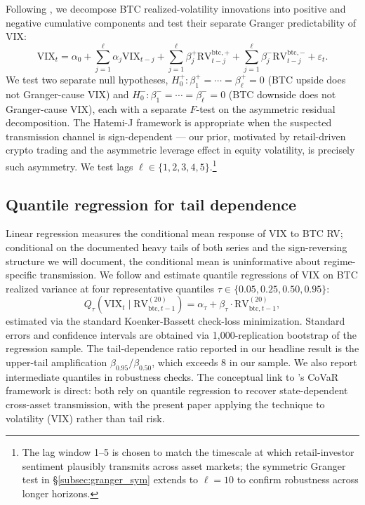 \documentclass[11pt,a4paper]{article}
\begin{document}
Following \citet{hatemi2012}, we decompose BTC realized-volatility innovations into positive and negative cumulative components and test their separate Granger predictability of VIX:
\begin{equation}
\text{VIX}_t = \alpha_0 + \sum_{j=1}^{\ell} \alpha_j \text{VIX}_{t-j} + \sum_{j=1}^{\ell} \beta^{+}_j \text{RV}^{\text{btc},+}_{t-j} + \sum_{j=1}^{\ell} \beta^{-}_j \text{RV}^{\text{btc},-}_{t-j} + \varepsilon_t.
\label{eq:granger_asym}
\end{equation}
We test two separate null hypotheses, $H_0^+: \beta^{+}_1 = \cdots = \beta^{+}_\ell = 0$ (BTC upside does not Granger-cause VIX) and $H_0^-: \beta^{-}_1 = \cdots = \beta^{-}_\ell = 0$ (BTC downside does not Granger-cause VIX), each with a separate $F$-test on the asymmetric residual decomposition. The Hatemi-J framework is appropriate when the suspected transmission channel is sign-dependent --- our prior, motivated by retail-driven crypto trading and the asymmetric leverage effect in equity volatility, is precisely such asymmetry. We test lags $\ell \in \{1, 2, 3, 4, 5\}$.\footnote{The lag window 1--5 is chosen to match the timescale at which retail-investor sentiment plausibly transmits across asset markets; the symmetric Granger test in \S\ref{subsec:granger_sym} extends to $\ell = 10$ to confirm robustness across longer horizons.}

\subsection{Quantile regression for tail dependence}
\label{subsec:qr}

Linear regression measures the conditional mean response of VIX to BTC RV; conditional on the documented heavy tails of both series and the sign-reversing structure we will document, the conditional mean is uninformative about regime-specific transmission. We follow \citet{koenker1978} and estimate quantile regressions of VIX on BTC realized variance at four representative quantiles $\tau \in \{0.05, 0.25, 0.50, 0.95\}$:
\begin{equation}
Q_{\tau}(\text{VIX}_t \mid \text{RV}^{(20)}_{\text{btc}, t-1}) = \alpha_\tau + \beta_\tau \cdot \text{RV}^{(20)}_{\text{btc}, t-1},
\label{eq:qr}
\end{equation}
estimated via the standard Koenker-Bassett check-loss minimization. Standard errors and confidence intervals are obtained via 1{,}000-replication bootstrap of the regression sample. The tail-dependence ratio reported in our headline result is the upper-tail amplification $\beta_{0.95} / \beta_{0.50}$, which exceeds 8 in our sample. We also report intermediate quantiles in robustness checks. The conceptual link to \citet{adrian2016}'s CoVaR framework is direct: both rely on quantile regression to recover state-dependent cross-asset transmission, with the present paper applying the technique to volatility (VIX) rather than tail risk.
\end{document}
